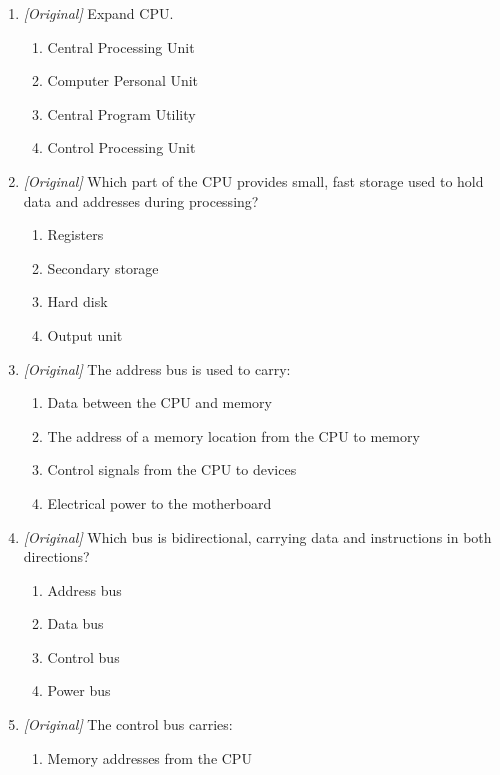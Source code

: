 \documentclass[11pt]{article}
\begin{document}
\begin{enumerate}[label=\textbf{Q\arabic*.}, leftmargin=*]
\begin{enumerate}[label=\Alph*.]
    \item ALU, control unit and registers
    \item Monitor, keyboard and mouse
  \end{enumerate}
\item \textit{[Original]} Expand CPU.
  \begin{enumerate}[label=\Alph*.]
    \item Central Processing Unit
    \item Computer Personal Unit
    \item Central Program Utility
    \item Control Processing Unit
  \end{enumerate}
\item \textit{[Original]} Which part of the CPU provides small, fast storage
  used to hold data and addresses during processing?
  \begin{enumerate}[label=\Alph*.]
    \item Registers
    \item Secondary storage
    \item Hard disk
    \item Output unit
  \end{enumerate}
\item \textit{[Original]} The address bus is used to carry:
  \begin{enumerate}[label=\Alph*.]
    \item Data between the CPU and memory
    \item The address of a memory location from the CPU to memory
    \item Control signals from the CPU to devices
    \item Electrical power to the motherboard
  \end{enumerate}
\item \textit{[Original]} Which bus is bidirectional, carrying data and
  instructions in both directions?
  \begin{enumerate}[label=\Alph*.]
    \item Address bus
    \item Data bus
    \item Control bus
    \item Power bus
  \end{enumerate}
\item \textit{[Original]} The control bus carries:
  \begin{enumerate}[label=\Alph*.]
    \item Memory addresses from the CPU

\end{enumerate}
\end{enumerate}
\end{document}
